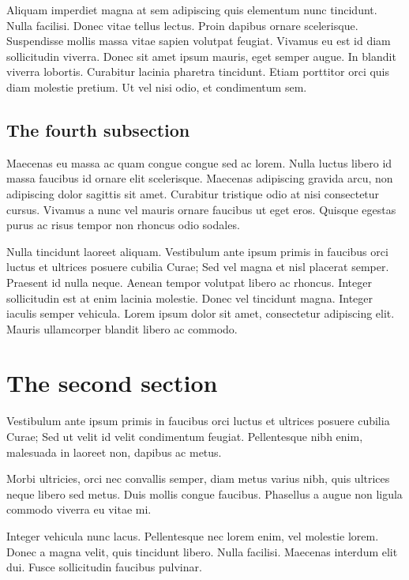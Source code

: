 Aliquam imperdiet magna at sem adipiscing quis elementum nunc tincidunt. Nulla facilisi. Donec vitae tellus lectus. Proin dapibus ornare scelerisque. Suspendisse mollis massa vitae sapien volutpat feugiat. Vivamus eu est id diam sollicitudin viverra. Donec sit amet ipsum mauris, eget semper augue. In blandit viverra lobortis. Curabitur lacinia pharetra tincidunt. Etiam porttitor orci quis diam molestie pretium. Ut vel nisi odio, et condimentum sem.

\subsection{The fourth subsection}
\label{ch2:first:d}
Maecenas eu massa ac quam congue congue sed ac lorem. Nulla luctus libero id massa faucibus id ornare elit scelerisque. Maecenas adipiscing gravida arcu, non adipiscing dolor sagittis sit amet. Curabitur tristique odio at nisi consectetur cursus. Vivamus a nunc vel mauris ornare faucibus ut eget eros. Quisque egestas purus ac risus tempor non rhoncus odio sodales. 

Nulla tincidunt laoreet aliquam. Vestibulum ante ipsum primis in faucibus orci luctus et ultrices posuere cubilia Curae; Sed vel magna et nisl placerat semper. Praesent id nulla neque. Aenean tempor volutpat libero ac rhoncus. Integer sollicitudin est at enim lacinia molestie. Donec vel tincidunt magna. Integer iaculis semper vehicula. Lorem ipsum dolor sit amet, consectetur adipiscing elit. Mauris ullamcorper blandit libero ac commodo.


\section{The second section}
\label{ch2:second}
Vestibulum ante ipsum primis in faucibus orci luctus et ultrices posuere cubilia Curae; Sed ut velit id velit condimentum feugiat. Pellentesque nibh enim, malesuada in laoreet non, dapibus ac metus. 

Morbi ultricies, orci nec convallis semper, diam metus varius nibh, quis ultrices neque libero sed metus. Duis mollis congue faucibus. Phasellus a augue non ligula commodo viverra eu vitae mi. 

Integer vehicula nunc lacus. Pellentesque nec lorem enim, vel molestie lorem. Donec a magna velit, quis tincidunt libero. Nulla facilisi. Maecenas interdum elit dui. Fusce sollicitudin faucibus pulvinar.

